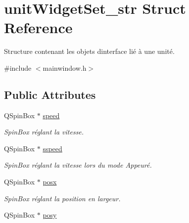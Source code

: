 \hypertarget{structunit_widget_set__str}{}\section{unit\+Widget\+Set\+\_\+str Struct Reference}
\label{structunit_widget_set__str}


Structure contenant les objets d\textquotesingle{}interface lié à une unité.  




{\ttfamily \#include $<$mainwindow.\+h$>$}

\subsection*{Public Attributes}
\begin{DoxyCompactItemize}
\item 
\hypertarget{structunit_widget_set__str_a434e160dda006f11ae717fee0718e0b7}{}Q\+Spin\+Box $\ast$ \hyperlink{structunit_widget_set__str_a434e160dda006f11ae717fee0718e0b7}{speed}\label{structunit_widget_set__str_a434e160dda006f11ae717fee0718e0b7}

\begin{DoxyCompactList}\small\item\em Spin\+Box réglant la vitesse. \end{DoxyCompactList}\item 
\hypertarget{structunit_widget_set__str_a72acd0e89c9f4a2128ccad7054a235f6}{}Q\+Spin\+Box $\ast$ \hyperlink{structunit_widget_set__str_a72acd0e89c9f4a2128ccad7054a235f6}{sspeed}\label{structunit_widget_set__str_a72acd0e89c9f4a2128ccad7054a235f6}

\begin{DoxyCompactList}\small\item\em Spin\+Box réglant la vitesse lors du mode Appeuré. \end{DoxyCompactList}\item 
\hypertarget{structunit_widget_set__str_a174d84c9d3802e2cc121d7f5a45ec730}{}Q\+Spin\+Box $\ast$ \hyperlink{structunit_widget_set__str_a174d84c9d3802e2cc121d7f5a45ec730}{posx}\label{structunit_widget_set__str_a174d84c9d3802e2cc121d7f5a45ec730}

\begin{DoxyCompactList}\small\item\em Spin\+Box réglant la position en largeur. \end{DoxyCompactList}\item 
\hypertarget{structunit_widget_set__str_a384ea3590f9ce6094295c813c9db0a17}{}Q\+Spin\+Box $\ast$ \hyperlink{structunit_widget_set__str_a384ea3590f9ce6094295c813c9db0a17}{posy}\label{structunit_widget_set__str_a384ea3590f9ce6094295c813c9db0a17}


\end{DoxyCompactItemize}
